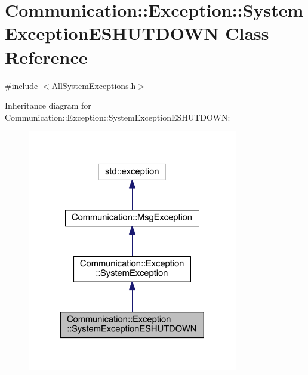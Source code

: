 \hypertarget{class_communication_1_1_exception_1_1_system_exception_e_s_h_u_t_d_o_w_n}{}\section{Communication\+:\+:Exception\+:\+:System\+Exception\+E\+S\+H\+U\+T\+D\+O\+W\+N Class Reference}
\label{class_communication_1_1_exception_1_1_system_exception_e_s_h_u_t_d_o_w_n}


{\ttfamily \#include $<$All\+System\+Exceptions.\+h$>$}



Inheritance diagram for Communication\+:\+:Exception\+:\+:System\+Exception\+E\+S\+H\+U\+T\+D\+O\+W\+N\+:\nopagebreak
\begin{figure}[H]
\begin{center}
\leavevmode
\includegraphics[width=260pt]{class_communication_1_1_exception_1_1_system_exception_e_s_h_u_t_d_o_w_n__inherit__graph}
\end{center}
\end{figure}



